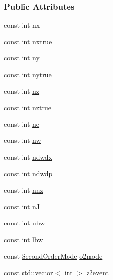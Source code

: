 \subsubsection*{Public Attributes}
\begin{DoxyCompactItemize}
\item 
const int \mbox{\hyperlink{classamici_1_1_model_a4f88110916f09b2adef33396203ff015}{nx}}
\item 
const int \mbox{\hyperlink{classamici_1_1_model_acf5766cc8560edbdcec5b8ef79459239}{nxtrue}}
\item 
const int \mbox{\hyperlink{classamici_1_1_model_a811734e12750524808dba01c57e92c66}{ny}}
\item 
const int \mbox{\hyperlink{classamici_1_1_model_a54bcfe56ad0df183516d096adf4e0b26}{nytrue}}
\item 
const int \mbox{\hyperlink{classamici_1_1_model_aa406c307f97060d218bc1fe594dfd08f}{nz}}
\item 
const int \mbox{\hyperlink{classamici_1_1_model_a9a451378ba5572ef7a3fd4dd89e1c227}{nztrue}}
\item 
const int \mbox{\hyperlink{classamici_1_1_model_a07d5274358ec39bfec473cd212a3cb78}{ne}}
\item 
const int \mbox{\hyperlink{classamici_1_1_model_a196986a3a7c4a7dff1c90ae254db7795}{nw}}
\item 
const int \mbox{\hyperlink{classamici_1_1_model_a761315b22459d5ca307556f210aece6b}{ndwdx}}
\item 
const int \mbox{\hyperlink{classamici_1_1_model_a1bd453ba21c508c3687f641d49430829}{ndwdp}}
\item 
const int \mbox{\hyperlink{classamici_1_1_model_aab84622e454402438efd61cc36645abe}{nnz}}
\item 
const int \mbox{\hyperlink{classamici_1_1_model_a0d2f49d2b15b08628451261e52f56e4f}{nJ}}
\item 
const int \mbox{\hyperlink{classamici_1_1_model_a8aac2b651892bb766a3cb79868944d81}{ubw}}
\item 
const int \mbox{\hyperlink{classamici_1_1_model_aa19cd03fcaffb7a0cebd666081c5a868}{lbw}}
\item 
const \mbox{\hyperlink{namespaceamici_a2d77779286167d5603a870bf9f6c21ba}{Second\+Order\+Mode}} \mbox{\hyperlink{classamici_1_1_model_acc235cad50283f7891e2d834f1cbeb90}{o2mode}}
\item 
const std\+::vector$<$ int $>$ \mbox{\hyperlink{classamici_1_1_model_af3343032542edf755502ca03f125a3e4}{z2event}}
\item 

\end{DoxyCompactItemize}
